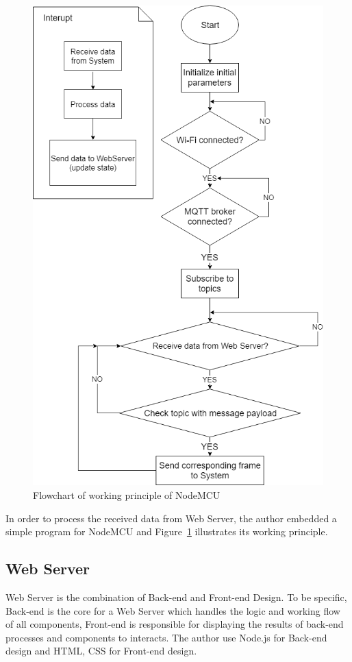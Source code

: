         \begin{figure}[!htbp]
            \begin{center}
            \includegraphics[scale=0.65]{images/mqttFlow.png}
            \caption{Flowchart of working principle of NodeMCU}
            \label{fig:mqttFlow}
            \end{center}
        \end{figure}
        In order to process the received data from Web Server, the author embedded a simple program for NodeMCU and Figure~\ref{fig:mqttFlow} illustrates its working principle.

    \subsection{Web Server}
    Web Server is the combination of Back-end and Front-end Design. To be specific, Back-end is the core for a Web Server which handles the logic and working flow of all components, Front-end is responsible for displaying the results of back-end processes and components to interacts. The author use Node.js for Back-end design and HTML, CSS for Front-end design.
